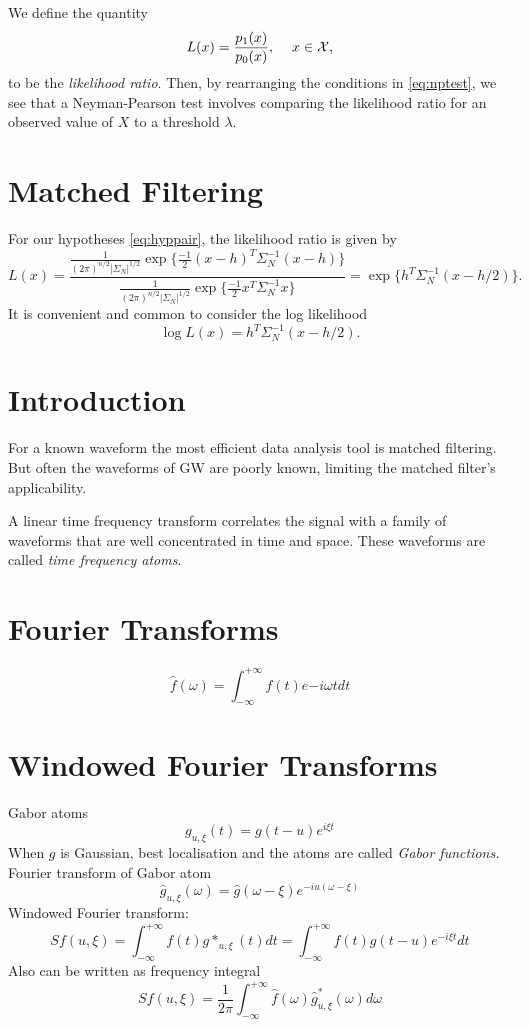 We define the quantity 
\begin{equation}
L(x)=\frac{p_1(x)}{p_0(x)}, \hspace{12pt} x\in\mathcal{X},
\end{equation}
to be the \textit{likelihood ratio}. Then, by rearranging the conditions in \ref{eq:nptest}, we see that a Neyman-Pearson test involves comparing the likelihood ratio for an observed value of $X$ to a threshold $\lambda$. 

\section{Matched Filtering}
For our hypotheses \ref{eq:hyppair}, the likelihood ratio is given by 
\begin{equation}
L(x)= \frac{\frac{1}{(2\pi)^{n/2}|\Sigma_N|^{1/2}}\exp\{\frac{-1}{2}(x-h)^T \Sigma_N^{-1}(x-h)\}}{\frac{1}{(2\pi)^{n/2}|\Sigma_N|^{1/2}}\exp\{\frac{-1}{2}x^T \Sigma_N^{-1}x\}} = \exp\{ h^T \Sigma_N^{-1} (x-h/2)\}.
\end{equation}
It is convenient and common to consider the log likelihood
\begin{equation}
\log L(x) = h^T \Sigma_N^{-1} (x-h/2).
\end{equation}



\section{Introduction}     
For a known waveform the most efficient data analysis tool is matched filtering. But often the waveforms of GW are poorly known, limiting the matched filter's applicability. 

A linear time frequency transform correlates the signal with a family of waveforms that are well concentrated in time and space. These waveforms are called \textit{time frequency atoms}.

\section{Fourier Transforms}
\[\hat{f}(\omega)=\int^{+\infty}_{-\infty}f(t)e{-i\omega t}dt \]

\section{Windowed Fourier Transforms}
Gabor atoms 
\[ g_{u,\xi} (t)=g(t-u)e^{i\xi t} \]
When $g$ is Gaussian, best localisation and the atoms are called \textit{Gabor functions.} Fourier transform of Gabor atom
\[ \hat{g}_{u,\xi} (\omega) =\hat{g}(\omega-\xi) e^{-iu(\omega-\xi)} \]
Windowed Fourier transform:
\[ Sf(u,\xi)=\int^{+\infty}_{-\infty}f(t)g*_{u,\xi}(t)dt=\int^{+\infty}_{-\infty}f(t)g(t-u)e^{-i\xi t}dt \]
Also can be written as frequency integral
\[ Sf(u,\xi)=\frac{1}{2\pi}\int^{+\infty}_{-\infty}\hat{f}(\omega)\hat{g}^{*}_{u,\xi}(\omega)d\omega \]

